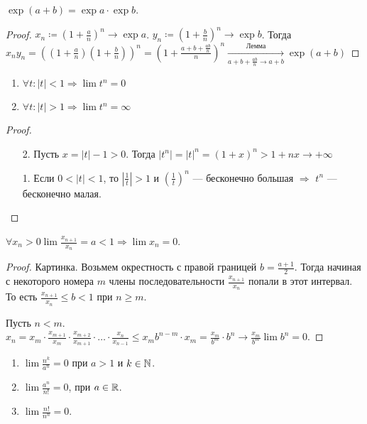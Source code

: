 \begin{theorem}
    $\exp(a+b) = \exp a \cdot \exp b$.
\end{theorem}
\begin{proof}
    $x_n \coloneqq \left(1+\frac{a}{n}\right)^n \to \exp a$. $y_n \coloneqq (1 + \frac{b}{n})^n \to \exp b$. Тогда $x_ny_n = \left((1+\frac{a}{n})(1+\frac{b}{n})\right)^n = \left(1+\frac{a+b+\frac{ab}{n}}{n}\right)^n \xrightarrow[a+b+\frac{ab}{n} \to a+b]{\text{Лемма}} \exp(a+b)$
\end{proof}
\begin{consequence}
    \slashn
    \begin{enumerate}
        \item $\forall t: |t| < 1 \Rightarrow \lim t^n = 0$
        \item  $\forall t: |t| > 1 \Rightarrow \lim t^n = \infty$
    \end{enumerate}
\end{consequence}
\begin{proof}
    \slashn
    \begin{enumerate}
        \item[2.] Пусть $x = |t| - 1 > 0$. Тогда  $|t^n| = |t|^n = (1+x)^n > 1+nx \to +\infty$
        \item[1.] Если $0<|t|<1$, то  $|\frac{1}{t}| > 1$ и $\left(\frac{1}{t}\right)^n$ --- бесконечно большая $\Rightarrow$ $t^n$ --- бесконечно малая. 
    \end{enumerate}
\end{proof}
\begin{theorem}
    $\forall x_n > 0 \lim \frac{x_{n+1}}{x_n} = a < 1 \Rightarrow \lim x_n = 0$.
\end{theorem}
\begin{proof}
    Картинка. Возьмем окрестность с правой границей $b = \frac{a+1}{2}$. Тогда начиная с некоторого номера $m$ члены последовательности  $\frac{x_{n+1}}{x_n}$ попали в этот интервал. То есть $\frac{x_{n+1}}{x_n} \le b < 1$ при $n \ge m$. 

    Пусть $n < m$.  $x_n = x_m \cdot \frac{x_{m+1}}{x_m} \cdot \frac{x_{m+2}}{x_{m+1}} \cdot \ldots \cdot \frac{x_n}{x_{n-1}} \le x_m b^{n-m}\cdot x_m = \frac{x_m}{b^m} \cdot b^n \to \frac{x_m}{b^m} \lim b^n = 0$. 
\end{proof}
\begin{consequence}
    \slashn
     \begin{enumerate}
         \item $\lim \frac{n^k}{a^n} = 0$ при $a>1$ и  $k \in \mathbb{N}$. 
         \item $\lim \frac{a^n}{n!} = 0$, при $a \in \mathbb{R}$.
         \item $\lim \frac{n!}{n^n} = 0$.
    \end{enumerate}
\end{consequence}
